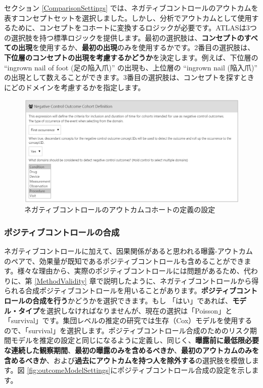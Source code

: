 \documentclass[
  11pt]{book}
\theoremstyle{definition}
\theoremstyle{definition}
\theoremstyle{definition}
\theoremstyle{definition}
\theoremstyle{remark}
\begin{document}
セクション \ref{ComparisonSettings} では、ネガティブコントロールのアウトカムを表すコンセプトセットを選択しました。しかし、分析でアウトカムとして使用するために、コンセプトをコホートに変換するロジックが必要です。ATLASは3つの選択肢を持つ標準ロジックを提供します。最初の選択肢は、\textbf{コンセプトのすべての出現}を使用するか、\textbf{最初の出現}のみを使用するかです。2番目の選択肢は、\textbf{下位層のコンセプトの出現を考慮するかどうか}を決定します。例えば、下位層の ``ingrown nail of foot (足の陥入爪)'' の出現も、上位層の ``ingrown nail (陥入爪)'' の出現として数えることができます。3番目の選択肢は、コンセプトを探すときにどのドメインを考慮するかを指定します。

\begin{figure}

{\centering \includegraphics[width=1\linewidth]{images/PopulationLevelEstimation/ncSettings} 

}

\caption{ネガティブコントロールのアウトカムコホートの定義の設定}\label{fig:ncSettings}
\end{figure}

\subsubsection*{ポジティブコントロールの合成}\label{ux30ddux30b8ux30c6ux30a3ux30d6ux30b3ux30f3ux30c8ux30edux30fcux30ebux306eux5408ux6210}

ネガティブコントロールに加えて、因果関係があると思われる曝露-アウトカムのペアで、効果量が既知であるポジティブコントロールも含めることができます。様々な理由から、実際のポジティブコントロールには問題があるため、代わりに、第 \ref{MethodValidity} 章で説明したように、ネガティブコントロールから得られる合成ポジティブコントロールを用いることがあります。\textbf{ポジティブコントロールの合成を行う}かどうかを選択できます。もし 「はい」であれば、\textbf{モデル・タイプ}を選択しなければなりませんが、現在の選択は「Poisson」と 「survival」です。集団レベルの推定の研究では生存（Cox）モデルを使用するので、「survival」を選択します。ポジティブコントロール合成のためのリスク期間モデルを推定の設定と同じになるように定義し、同じく、\textbf{曝露前に最低限必要な連続した観察期間}、\textbf{最初の曝露のみを含めるべきか}、\textbf{最初のアウトカムのみを含めるべきか}、および\textbf{過去にアウトカムを持つ人を除外する}の選択肢を模倣します。図 \ref{fig:outcomeModelSettings}にポジティブコントロール合成の設定を示します。
\end{document}
